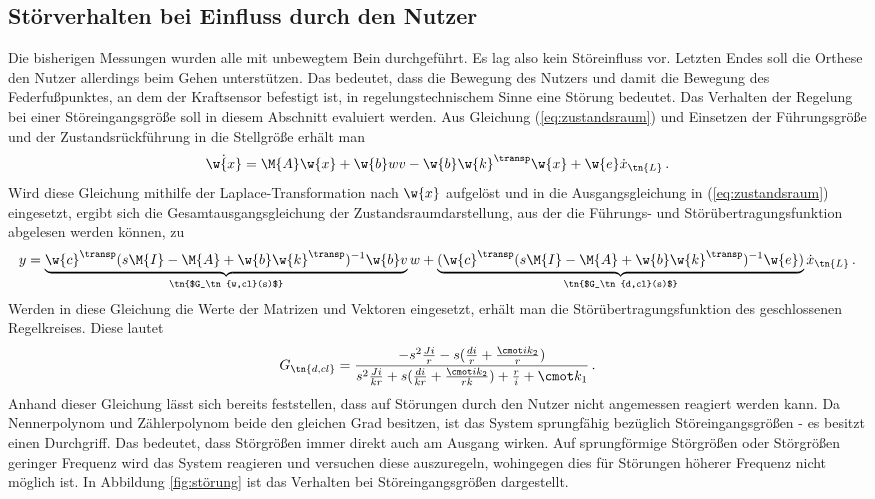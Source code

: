 \subsection{Störverhalten bei Einfluss durch den Nutzer}\label{sec:störung}
Die bisherigen Messungen wurden alle mit unbewegtem Bein durchgeführt. Es lag also kein Störeinfluss vor. Letzten Endes soll die Orthese den Nutzer allerdings beim Gehen unterstützen. Das bedeutet, dass die Bewegung des Nutzers und damit die Bewegung des Federfußpunktes, an dem der Kraftsensor befestigt ist, in regelungstechnischem Sinne eine Störung bedeutet. Das Verhalten der Regelung bei einer Störeingangsgröße soll in diesem Abschnitt evaluiert werden. 
Aus Gleichung (\ref{eq:zustandsraum}) und Einsetzen der Führungsgröße und der Zustandsrückführung in die Stellgröße erhält man 
\begin{equation}\label{eq:zustandsraum2}
	\dot{\w{x}} = \M{A}  \w{x} + \w{b}  wv - \w{b} \w{k}^\transp \w{x} + \w{e} \dot{x}_\tn{L}\, .
\end{equation}
Wird diese Gleichung mithilfe der Laplace-Transformation nach $\w{x}$ aufgelöst und in die Ausgangsgleichung in (\ref{eq:zustandsraum}) eingesetzt, ergibt sich die Gesamtausgangsgleichung der Zustandsraumdarstellung, aus der die Führungs- und Störübertragungsfunktion abgelesen werden können, zu 
\begin{equation}\label{eq:ausgangsgleichung_zustandsraum}
	y = \underbrace{\w{c}^\transp(s\M{I}-\M{A} + \w{b}\w{k}^\transp)^{-1}\w{b}v}_\tn{$G_\tn{w,cl}(s)$}w + \underbrace{(\w{c}^\transp(s\M{I}-\M{A} + \w{b}\w{k}^\transp)^{-1}\w{e})}_\tn{$G_\tn{d,cl}(s)$}\dot{x}_\tn{L} \, .
\end{equation} 
Werden in diese Gleichung die Werte der Matrizen und Vektoren eingesetzt, erhält man die Störübertragungsfunktion des geschlossenen Regelkreises. Diese lautet
\begin{equation}\label{eq:störübertragungsfunktion,closed}
	G_\tn{d,cl} = \frac{-s^2\frac{Ji}{r}-s(\frac{di}{r} + \frac{\cmot i k_2}{r})}{s^2\frac{Ji}{kr} + s(\frac{di}{kr} + \frac{\cmot i k_2}{rk}) + \frac{r}{i} + \cmot k_1} \, .
\end{equation}
Anhand dieser Gleichung lässt sich bereits feststellen, dass auf Störungen durch den Nutzer nicht angemessen reagiert werden kann. Da Nennerpolynom und Zählerpolynom beide den gleichen Grad besitzen, ist das System sprungfähig bezüglich Störeingangsgrößen - es besitzt einen Durchgriff. Das bedeutet, dass Störgrößen immer direkt auch am Ausgang wirken. Auf sprungförmige Störgrößen oder Störgrößen geringer Frequenz wird das System reagieren und versuchen diese auszuregeln, wohingegen dies für Störungen höherer Frequenz nicht möglich ist. In Abbildung \ref{fig:störung} ist das Verhalten bei Störeingangsgrößen dargestellt.

